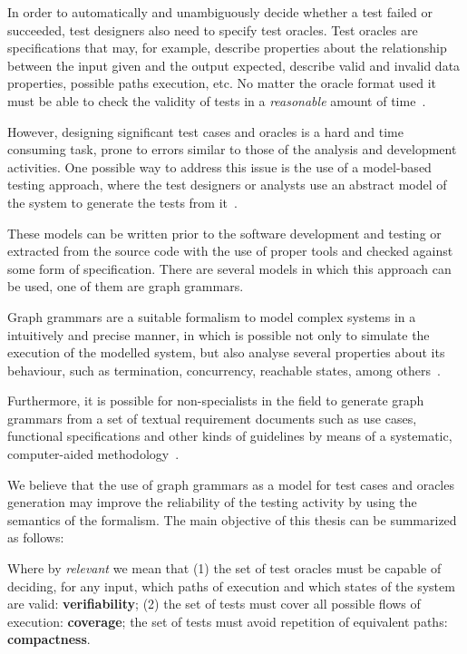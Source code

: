 In order to automatically and unambiguously decide whether a test failed or succeeded, test designers also need to specify test oracles. Test oracles are specifications that may, for example, describe properties about the relationship between the input given and the output expected, describe valid and invalid data properties, possible paths execution, etc. No matter the oracle format used it must be able to check the validity of tests in a \textit{reasonable} amount of time~\cite{Weyuker1982}.

However, designing significant test cases and oracles is a hard and time consuming task, prone to errors similar to those of the analysis and development activities. One possible way to address this issue is the use of a model-based testing approach, where the test designers or analysts use an abstract model of the system to generate the tests from it~\cite{Utting2006}. 

These models can be written prior to the software development and testing or extracted from the source code with the use of proper tools and checked against some form of specification. There are several models in which this approach can be used, one of them are graph grammars.

Graph grammars are a suitable formalism to model complex systems in a intuitively and precise manner, in which is possible not only to simulate the execution of the modelled system, but also analyse several properties about its behaviour, such as termination, concurrency, reachable states, among others~\cite{Ehrig2006}.

Furthermore, it is possible for non-specialists in the field to generate graph grammars from a set of textual requirement documents such as use cases, functional specifications and other kinds of guidelines by means of a systematic, computer-aided methodology~\cite{Junior2015,BezerraWEIT2016,Cota2017}.

We believe that the use of graph grammars as a model for test cases and oracles generation may improve the reliability of the testing activity by using the semantics of the formalism. The main objective of this thesis can be summarized as follows:

\begin{intuition}
\end{intuition}\hfill\break

Where by \emph{relevant} we mean that (1) the set of test oracles must be capable of deciding, for any input, which paths of execution and which states of the system are valid: \textbf{verifiability}; (2) the set of tests must cover all possible flows of execution: \textbf{coverage}; the set of tests must avoid repetition of equivalent paths: \textbf{compactness}.

